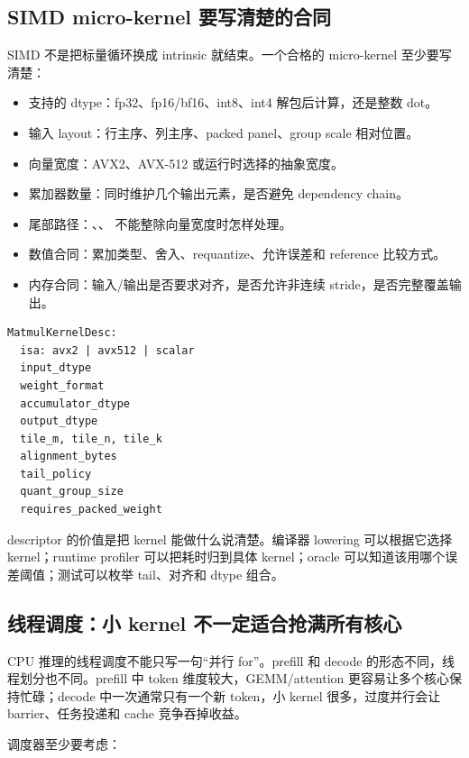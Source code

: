 \subsection{SIMD micro-kernel 要写清楚的合同}

SIMD 不是把标量循环换成 intrinsic 就结束。一个合格的 micro-kernel 至少要写清楚：

\begin{itemize}
  \item 支持的 dtype：fp32、fp16/bf16、int8、int4 解包后计算，还是整数 dot。
  \item 输入 layout：行主序、列主序、packed panel、group scale 相对位置。
  \item 向量宽度：AVX2、AVX-512 或运行时选择的抽象宽度。
  \item 累加器数量：同时维护几个输出元素，是否避免 dependency chain。
  \item 尾部路径：、、 不能整除向量宽度时怎样处理。
  \item 数值合同：累加类型、舍入、requantize、允许误差和 reference 比较方式。
  \item 内存合同：输入/输出是否要求对齐，是否允许非连续 stride，是否完整覆盖输出。
\end{itemize}

\begin{lstlisting}[numbers=none,caption={micro-kernel descriptor 需要表达的信息}]
MatmulKernelDesc:
  isa: avx2 | avx512 | scalar
  input_dtype
  weight_format
  accumulator_dtype
  output_dtype
  tile_m, tile_n, tile_k
  alignment_bytes
  tail_policy
  quant_group_size
  requires_packed_weight
\end{lstlisting}

descriptor 的价值是把 kernel 能做什么说清楚。编译器 lowering 可以根据它选择 kernel；runtime profiler 可以把耗时归到具体 kernel；oracle 可以知道该用哪个误差阈值；测试可以枚举 tail、对齐和 dtype 组合。

\subsection{线程调度：小 kernel 不一定适合抢满所有核心}

CPU 推理的线程调度不能只写一句“并行 for”。prefill 和 decode 的形态不同，线程划分也不同。prefill 中 token 维度较大，GEMM/attention 更容易让多个核心保持忙碌；decode 中一次通常只有一个新 token，小 kernel 很多，过度并行会让 barrier、任务投递和 cache 竞争吞掉收益。

调度器至少要考虑：

